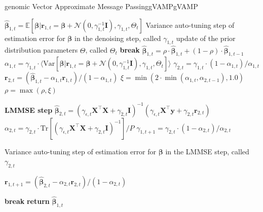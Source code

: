 \begin{breakablealgorithm}{genomic Vector Approximate Message Passing}{gVAMP}{gVAMP}
\begin{algorithmic}[1]
                \STATE $\hat{\bm{\beta}}_{1,t} = \mathbb{E}[\bm{\beta} | \bm{r}_{1,t} = \bm{\beta} + \mathcal{N}(0, \gamma_{1,t}^{-1}\bm{I}), \gamma_{1,t}, \Theta_{t}]$
                    \STATE Variance auto-tuning step of estimation error for $\bm\beta$ in the denoising step, called $\gamma_{1,t}$ 
                    \STATE {} update of the prior distribution parameters $\Theta$, called $\Theta_t$
                        \STATE \textbf{break}
                    \ENDIF
                \ENDIF
            \ENDFOR
                \STATE $\hat{\bm{\beta}}_{1,t} = \rho \cdot \hat{\bm{\beta}}_{1,t} + (1-\rho) \cdot \hat{\bm{\beta}}_{1,t-1}$
            \ENDIF
            \STATE $\alpha_{1,t} = \gamma_{1,t} \cdot \langle \text{Var}[\bm{\beta}|\bm{r}_{1,t} = \bm{\beta} + \mathcal{N}(0, \gamma_{1,t}^{-1}\bm{I}), \gamma_{1,t}, \Theta_{t}] \rangle$
            \STATE $\gamma_{2,t} = \gamma_{1,t} \cdot (1 - \alpha_{1,t}) / \alpha_{1,t}$ 
            \STATE $\bm{r}_{2,t} = (\hat{\bm{\beta}}_{1,t} - \alpha_{1,t} \bm{r}_{1,t}) / (1-\alpha_{1,t})$
            \STATE $\xi = \min (2\cdot \min(\alpha_{1,t}, \alpha_{2,t-1}), 1.0)$ 
            \STATE $\rho = \max(\rho, \xi)$
            \item[]
            \STATE \textbf{LMMSE step}
            \STATE $\hat{\bm{\beta}}_{2,t} =  ( \gamma_{\epsilon,t} \bm{X}^\top\bm{X} + \gamma_{2,t} \bm{I} )^{-1} ( \gamma_{\epsilon,t} \bm{X}^\top \bm{y} + \gamma_{2,t} \bm{r}_{2,t} )$ 
            \STATE $\alpha_{2,t} = \gamma_{2,t} \cdot \text{Tr}[(\gamma_{\epsilon,t} \bm{X}^\top\bm{X} + \gamma_{2,t}\bm{I})^{-1}] / P$
            \STATE $\gamma_{1,t+1} = \gamma_{2,t} \cdot (1-\alpha_{2,t}) / \alpha_{2,t}$
                \STATE \parbox[t]{\dimexpr\linewidth-3\algorithmicindent}{%
                    Variance auto-tuning step of estimation error for $\bm\beta$ in the LMMSE step, called $\gamma_{2,t}$}
            \ENDIF
            \STATE $\bm{r}_{1,t+1} = (\hat{\bm{\beta}}_{2,t} - \alpha_{2,t} \bm{r}_{2,t}) / (1-\alpha_{2,t})$ 
            \item[]
                \STATE \textbf{break}
            \ENDIF
        \ENDFOR
        \STATE \textbf{return} $\hat{\bm{\beta}}_{1,t}$
    \end{algorithmic}
\end{breakablealgorithm}

